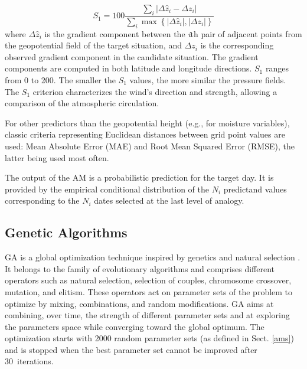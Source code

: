 \documentclass[draft]{agujournal2019}
\begin{document}
\begin{equation}
	\label{eq:S1}
	S_{1}=100 \frac {
        \displaystyle \sum_{i} 
            \vert \Delta\hat{z}_{i} - 
            \Delta z_{i} \vert
    }
	{
        \displaystyle \sum_{i} \max\left\lbrace 
            \vert \Delta\hat{z}_{i} \vert , 
            \vert \Delta z_{i} \vert \right
        \rbrace 
    }
\end{equation}
where $\Delta \hat{z}_{i}$ is the gradient component between the \textit{i}th pair of adjacent points from the geopotential field of the target situation, and $\Delta z_{i}$ is the corresponding observed gradient component in the candidate situation. The gradient components are computed in both latitude and longitude directions. $S_{1}$ ranges from 0 to 200. The smaller the $S_{1}$ values, the more similar the pressure fields. The $S_{1}$ criterion characterizes the wind's direction and strength, allowing a comparison of the atmospheric circulation.

For other predictors than the geopotential height (e.g., for moisture variables), classic criteria representing Euclidean distances between grid point values are used: Mean Absolute Error (MAE) and Root Mean Squared Error (RMSE), the latter being used most often.

The output of the AM is a probabilistic prediction for the target day. It is provided by the empirical conditional distribution of the $N_{i}$ predictand values corresponding to the $N_{i}$ dates selected at the last level of analogy.


\subsection{Genetic Algorithms}
\label{gas}

GA is a global optimization technique inspired by genetics and natural selection \cite{Holland1992b}. It belongs to the family of evolutionary algorithms and comprises different operators such as natural selection, selection of couples, chromosome crossover, mutation, and elitism. These operators act on parameter sets of the problem to optimize by mixing, combinations, and random modifications. GA aims at combining, over time, the strength of different parameter sets and at exploring the parameters space while converging toward the global optimum. The optimization starts with 2000 random parameter sets (as defined in Sect. \ref{ams}) and is stopped when the best parameter set cannot be improved after 30~iterations.
\end{document}
